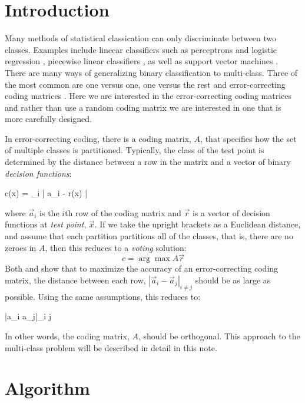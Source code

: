 
\section{Introduction}

Many methods of statistical classication can only discriminate between two classes. 
Examples include lineear classifiers such as perceptrons and logistic regression \citep{Michie_etal1994}, 
piecewise linear classifiers \citep{Herman_Yeung1992,Mills2018},
as well as support vector machines \citep{kernel_intro}.
There are many ways of generalizing binary classification to 
multi-class.
Three of the most common are one versus one, one versus the rest and 
error-correcting coding matrices \citep{Hsu_Lin2002}.
Here we are interested in the error-correcting coding matrices
\citep{Dietterich_Bakiri1995,Windeatt_Ghaderi2002} and
rather than use a random coding matrix we are interested in one that is
more carefully designed.

In error-correcting coding, there is a coding matrix, $A$, that specifies
how the set of multiple classes is partitioned.
Typically, the class of the test point is determined by the distance between
a row in the matrix and a vector of binary {\it decision functions}:
\begin{eqnnon}
	c(\vec x) = \arg \min_i | \vec a_i - \vec r(\vec x) |
	\label{min_dist}
\end{eqnnon}
where $\vec a_i$ is the $i$th row of the coding matrix and $\vec r$
is a vector of decision functions at {\it test point}, $\vec x$.
If we take the upright brackets as a Euclidean distance, and assume that
each partition partitions all of the classes, that is, there are no zeroes
in $A$, then this reduces to a {\it voting} solution:
\begin{equation}
	c = \arg \max A \vec r \label{voting}
\end{equation}
Both \citet{Allwein_etal2000} and \citet{Windeatt_Ghaderi2002} show that to
maximize the accuracy of an error-correcting coding matrix, the distance
between each row, $|\vec a_i - \vec a_j|_{i \ne j}$ should be as
large as possible.
Using the same assumptions, this reduces to:
\begin{eqnnon}
	\min |\vec a_i \cdot \vec a_j|_{i \ne j}
\end{eqnnon}
In other words, the coding matrix, $A$, should be orthogonal.
This approach to the multi-class problem will be described in detail in this note.

\section{Algorithm}

